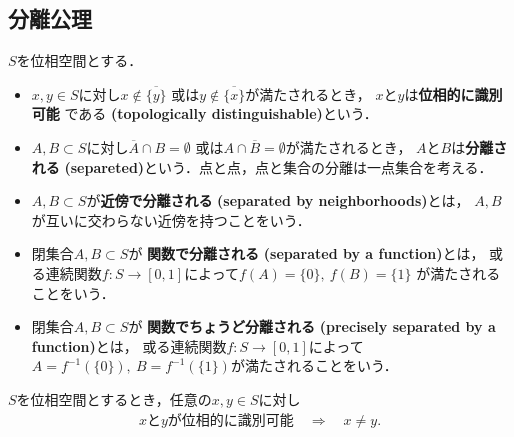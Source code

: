 \subsection{分離公理}
	\begin{screen}
		\begin{dfn}[位相的に識別可能・分離]
			$S$を位相空間とする．
			\begin{itemize}
				\item $x,y \in S$に対し$x \notin \overline{\{y\}}$
					或は$y \notin \overline{\{x\}}$が満たされるとき，
					$x$と$y$は{\bf 位相的に識別可能}
					である
					{\bf (topologically distinguishable)}という．
				\item $A,B \subset S$に対し$\overline{A} \cap B = \emptyset$
					或は$A \cap \overline{B} = \emptyset$が満たされるとき，
					$A$と$B$は{\bf 分離される}
					{\bf (separeted)}という．点と点，点と集合の分離は一点集合を考える．
				\item $A,B \subset S$が{\bf 近傍で分離される}
					{\bf (separated by neighborhoods)}とは，
					$A,B$が互いに交わらない近傍を持つことをいう．
				\item 閉集合$A,B \subset S$が
					{\bf 関数で分離される}
					{\bf (separated by a function)}とは，
					或る連続関数$f:S \longrightarrow [0,1]$によって$f(A) = \{0\},\ f(B) = \{1\}$
					が満たされることをいう．
				\item 閉集合$A,B \subset S$が
					{\bf 関数でちょうど分離される}
					{\bf (precisely separated by a function)}とは，
					或る連続関数$f:S \longrightarrow [0,1]$によって
					$A = f^{-1}(\{0\}),\ B = f^{-1}(\{1\})$が満たされることをいう．
			\end{itemize}
		\end{dfn}
	\end{screen}
	
	\begin{screen}
		\begin{thm}[位相的に識別可能な二点は相異なる]
			$S$を位相空間とするとき，任意の$x,y \in S$に対し
			\begin{align}
				\mbox{$x$と$y$が位相的に識別可能} \quad \Longrightarrow \quad
				x \neq y .
			\end{align}
		\end{thm}
	\end{screen}
	
